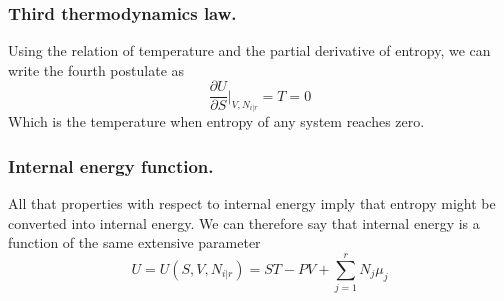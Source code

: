 \documentclass[../../../Main.tex]{subfiles}
\begin{document}
\subsubsection*{Third thermodynamics law.} Using the relation of temperature and the partial derivative of entropy, we can write the fourth postulate as 
\begin{equation*}
    \frac{\partial U}{\partial S}\bigg|_{V,N_{i|r}}=T=0
\end{equation*} 
Which is the temperature when entropy of any system reaches zero.

\subsubsection*{Internal energy function.} All that properties with respect to internal energy imply that entropy might be converted into internal energy. We can therefore say that internal energy is a function of the same extensive parameter
\begin{equation*}
    U=U(S,V,N_{i|r})=ST-PV+\sum_{j=1}^{r}N_j\mu_j
\end{equation*}
\end{document}
